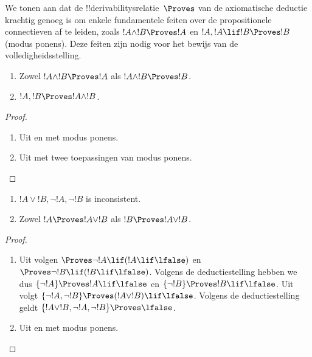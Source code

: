 \documentclass[../../../include/open-logic-section]{subfiles}
\begin{document}
      {}
      {}


\begin{explain}
  We tonen aan dat de !!{derivability}srelatie~$\Proves$ van de
  axiomatische deductie krachtig genoeg is om enkele fundamentele
  feiten over de propositionele connectieven af te leiden, zoals
  $!A \land !B \Proves !A$ en $!A, !A \lif !B \Proves !B$ (modus
  ponens). Deze feiten zijn nodig voor het bewijs van de
  volledigheidsstelling.
\end{explain}

\begin{prop}
  \begin{enumerate}
  \item {} Zowel $!A \land !B \Proves
    !A$ als $!A \land !B \Proves !B$.
  \item {} $!A, !B \Proves !A \land !B$.
  \end{enumerate}
\end{prop}

\begin{proof}
  \begin{enumerate}
    \item Uit  en  met
      modus ponens.
  \item Uit  met twee toepassingen van modus
    ponens.
  \end{enumerate}
\end{proof}


\begin{prop}
  \begin{enumerate}
  \item $!A \lor !B, \lnot !A, \lnot !B$ is inconsistent.
  \item Zowel $!A \Proves !A \lor !B$ als $!B \Proves !A \lor !B$.
  \end{enumerate}
\end{prop}

\begin{proof}
  \begin{enumerate}
  \item Uit  volgen $\Proves \lnot !A \lif (!A
    \lif \lfalse)$ en $\Proves \lnot !B \lif (!B \lif \lfalse)$.
    Volgens de deductiestelling hebben we dus $\{\lnot !A\} \Proves
    !A \lif \lfalse$ en $\{\lnot !B\} \Proves !B \lif \lfalse$. Uit
     volgt $\{\lnot !A, \lnot !B\} \Proves (!A
    \lor !B) \lif \lfalse$. Volgens de deductiestelling geldt
    $\{!A \lor !B, \lnot !A, \lnot !B\} \Proves \lfalse$.
  \item Uit  en  met modus
    ponens.
  \end{enumerate}
\end{proof}
\end{document}
